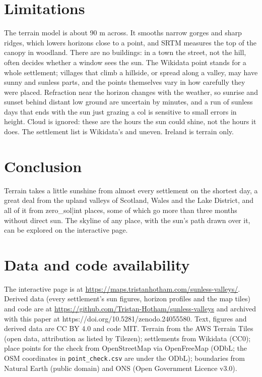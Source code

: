 \documentclass[11pt,a4paper]{article}
\begin{document}
\section{Limitations}\label{sec:limits}
The terrain model is about 90 m across. It smooths narrow gorges and sharp ridges, which lowers horizons close to a point, and SRTM measures the top of the canopy in woodland. There are no buildings: in a town the street, not the hill, often decides whether a window sees the sun. The Wikidata point stands for a whole settlement; villages that climb a hillside, or spread along a valley, may have sunny and sunless parts, and the points themselves vary in how carefully they were placed. Refraction near the horizon changes with the weather, so sunrise and sunset behind distant low ground are uncertain by minutes, and a run of sunless days that ends with the sun just grazing a col is sensitive to small errors in height. Cloud is ignored: these are the hours the sun could shine, not the hours it does. The settlement list is Wikidata's and uneven. Ireland is terrain only.

\section{Conclusion}
Terrain takes a little sunshine from almost every settlement on the shortest day, a great deal from the upland valleys of Scotland, Wales and the Lake District, and all of it from {{zero_sol|int}} places, some of which go more than three months without direct sun. The skyline of any place, with the sun's path drawn over it, can be explored on the interactive page.

\section*{Data and code availability}
The interactive page is at \url{https://maps.tristanhotham.com/sunless-valleys/}. Derived data (every settlement's sun figures, horizon profiles and the map tiles) and code are at \url{https://github.com/Tristan-Hotham/sunless-valleys} and archived with this paper at https://doi.org/10.5281/zenodo.24055580. Text, figures and derived data are CC BY 4.0 and code MIT. Terrain from the AWS Terrain Tiles (open data, attribution as listed by Tilezen); settlements from Wikidata (CC0); place points for the check from OpenStreetMap via OpenFreeMap (ODbL; the OSM coordinates in \texttt{point\_check.csv} are under the ODbL); boundaries from Natural Earth (public domain) and ONS (Open Government Licence v3.0).
\end{document}
